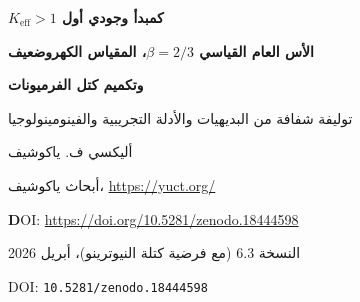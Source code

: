 \documentclass[12pt,a4paper]{article}
\begin{document}
	
	\begin{titlepage}
		\centering
		\vspace*{1cm}
		
		{\Huge\bfseries \(K_{\mathrm{eff}} > 1\) كمبدأ وجودي أول\par}
		\vspace{0.3cm}
		{\Large\bfseries الأس العام القياسي \(\beta = 2/3\)، المقياس الكهروضعيف\par}
		\vspace{0.1cm}
		{\Large\bfseries وتكميم كتل الفرميونات\par}
		\vspace{0.5cm}
		{\large توليفة شفافة من البديهيات والأدلة التجريبية والفينومينولوجيا\par}
		
		\vspace{1cm}
		
		{\large أليكسي ف. ياكوشيف\par}
		\vspace{0.3cm}
		{\normalsize أبحاث ياكوشيف، \url{https://yuct.org/}\par} 
		
		\vspace{0.5cm}
		{\sffamily\footnotesize \textbf DOI: \url{https://doi.org/10.5281/zenodo.18444598}}%
		
		\vspace{1.0cm}
		
		{\normalsize النسخة 6.3 (مع فرضية كتلة النيوترينو)، أبريل 2026\par}
		\vspace{0.3cm}
		{\normalsize DOI: \texttt{10.5281/zenodo.18444598}\par}
		
		\vfill
		
		\begin{abstract}
			\noindent
			نقدم البنية المنطقية النهائية لنظرية ياكوشيف الموحدة للتنسيق (YUCT). كل عبارة مصنفة كـ \textbf{بديهية} (مسلمة غير قابلة للاختزال)، أو \textbf{نظرية} (مبرهنة من البديهيات)، أو \textbf{قانون تجريبي} (ملاحظ بشكل قوي)، أو \textbf{تطابق فينومينولوجي} (مقيد لكنه لم يُشتق بعد). من تعريف كفاءة التنسيق \(K_{\mathrm{eff}} > 1\) وثلاث بديهيات بنيوية نُبرهن أن عامل الوفرة في القاموس هو \(q = 2/3\). الأُس العام \(\beta = 2/3\) هو \textbf{قانون تجريبي} مؤكد بأكثر من اثنتي عشرة تجربة مستقلة على المقاييس الذرية والبيولوجية والجيوفيزيائية والكونية. من \(\beta = 2/3\) نستنتج الثوابت الجبرية \(S_{\mathrm{odd}} = 1.2\) و \(S_{\mathrm{even}} = 0.8\) (حلقة جبرية مغلقة). باستخدام عدد درجات حرية فرميونات ويل (\(96\)) نحصل على المقياس الكهروضعيف (\(m_W \approx 80.4\) GeV) مع عامل وحيد \(\xi_W\). نفس البنية الجبرية تعطي كم تقييس \(q = (3/2)^{1/3}\). كتل الفرميونات المشحونة التسعة تقع على سلم أنصاف أعداد صحيحة بدقة أفضل من \(1\%\) (الأعداد الكمية المعينة \(N_f\) تم تطابقها حالياً). البنية المتقطعة لهذا السلم هي \textbf{تنبؤ قابل للتكذيب}: أي جسيم مستقبلي بكتلة خارج المجموعة المسموحة \(\{m_e q^{N/2}\}\) سيفند النظرية. لأخف نيوترينو، الكتل المسموحة هي \(\{0.0234, 0.0268, 0.0307, 0.0352, \dots\}\) eV. لا تحتوي النظرية على معاملات مستمرة قابلة للتعديل، وتقدم عدة تنبؤات أخرى ملموسة وقابلة للاختبار.
			

\end{abstract}
\end{titlepage}
\end{document}
